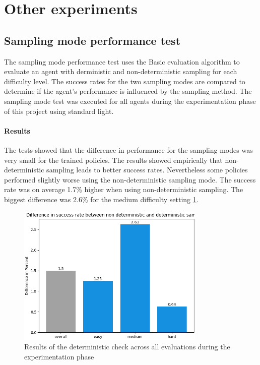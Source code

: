 \section{Other experiments}

\subsection{Sampling mode performance test}
\label{ref:sampling_mode_test_results}

The sampling mode performance test uses the Basic evaluation algorithm to evaluate an agent with derministic and non-deterministic sampling for each difficulty level. The success rates for the two sampling modes are compared to determine if the agent's performance is influenced by the sampling method. The sampling mode test was executed for all agents during the experimentation phase of this project using standard light.

\paragraph{Results}
The tests showed that the difference in performance for the sampling modes was very small for the trained policies. The results showed empirically that non-deterministic sampling leads to better success rates. Nevertheless some policies performed slightly worse using the non-deterministic sampling mode. The success rate was on average 1.7\% higher when using non-deterministic sampling. The biggest difference was 2.6\% for the medium difficulty setting \ref{fig:deterministic_check_result}.

\begin{figure}
    \centering
    \includegraphics[width=0.8\textwidth]{Bilder/notebook_images/deterministic_check_results.png}
    \caption{Results of the deterministic check across all evaluations during the experimentation phase}
    \label{fig:deterministic_check_result}
\end{figure}

